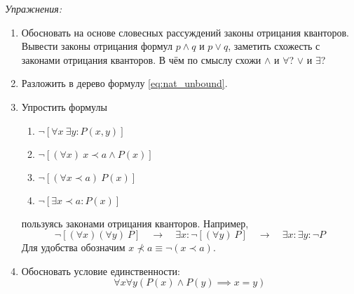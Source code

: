\vspace{1em}
{\it Упражнения:}
\begin{enumerate}
  \item{}Обосновать на основе словесных рассуждений законы отрицания
  кванторов\label{ex:quantor_neg_def}. Вывести законы отрицания формул
  $p\land q$ и $p\lor q$, заметить схожесть с законами отрицания кванторов.
  В чём по смыслу схожи $\land$ и $\forall$? $\lor$ и $\exists$?

  \item{}Разложить в дерево формулу \eqref{eq:nat_unbound}.

  \item{}Упростить формулы
  \begin{multicols}{2}
    \begin{enumerate}
      \item{}$\lnot[\forall x~\exists y:P(x,y)]$
      \item{}$\lnot[(\forall x)~ x\prec a\land P(x)]$
      \item{}$\lnot[(\forall x\prec a)~P(x)]$
      \item{}$\lnot[\exists x\prec a:P(x)]$
    \end{enumerate}
  \end{multicols}
  пользуясь законами отрицания кванторов.
  Например,
  \[
    \lnot [(\forall x)(\forall y)~P]\quad\to\quad
    \exists x:\lnot [(\forall y)~P]\quad\to\quad
    \exists x:\exists y:\lnot P
  \]
  Для удобства обозначим $x\nprec a\equiv \lnot(x\prec a)$.

  \item{}Обосновать условие единственности:
  \[
    \forall x\forall y(P(x)\land P(y)\implies x=y)
  \]
\end{enumerate}
